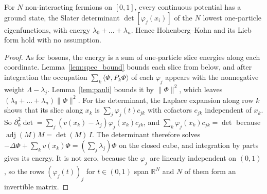 \begin{theorem}
  \label{thm:free_fermions_line}
  \leanok
  For $N$ non-interacting fermions on $[0,1]$, every continuous potential has a ground state, the Slater determinant
  $\det[\varphi_j(x_i)]$ of the $N$ lowest one-particle eigenfunctions, with energy $\lambda_0+\dots+\lambda_n$.
  Hence Hohenberg--Kohn and its Lieb form hold with no assumption.
\end{theorem}
\begin{proof}
  \leanok
  As for bosons, the energy is a sum of one-particle slice energies along each coordinate. Lemma~\ref{lem:spec_bound}
  bounds each slice from below, and after integration the occupation $\sum_k\langle\Phi,P_k\Phi\rangle$ of each
  $\varphi_j$ appears with the nonnegative weight $\Lambda-\lambda_j$. Lemma~\ref{lem:pauli} bounds it by
  $\|\Phi\|^2$, which leaves $(\lambda_0+\dots+\lambda_n)\|\Phi\|^2$. For the determinant, the Laplace expansion along
  row $k$ shows that its slice along $x_k$ is $\sum_j\varphi_j(t)c_{jk}$ with cofactors $c_{jk}$ independent of $x_k$.
  So $\partial_k^2\det=\sum_j(v(x_k)-\lambda_j)\varphi_j(x_k)c_{jk}$, and $\sum_k\varphi_j(x_k)c_{jk}=\det$ because
  $\operatorname{adj}(M)M=\det(M)\,I$. The determinant therefore solves $-\Delta\Phi+\sum_kv(x_k)\Phi=(\sum_j\lambda_j)\Phi$
  on the closed cube, and integration by parts gives its energy. It is not zero, because the $\varphi_j$ are
  linearly independent on $(0,1)$, so the rows $(\varphi_j(t))_j$ for $t\in(0,1)$ span $\mathbb R^N$ and $N$ of them
  form an invertible matrix.
\end{proof}


